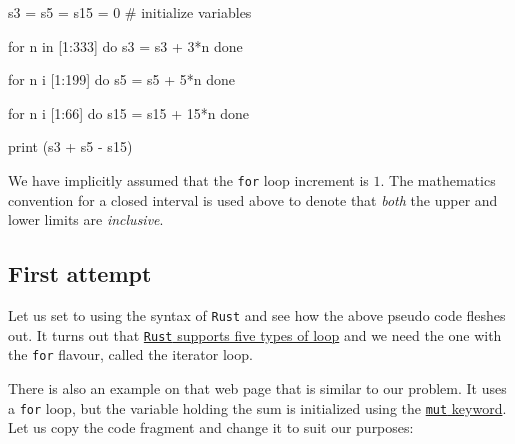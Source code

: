 \documentclass[
  a4paper,
]{article}
\newenvironment{Shaded}{\begin{snugshade}}{\end{snugshade}}
\newcommand{\NormalTok}[1]{\textcolor[rgb]{0.80,0.80,0.80}{#1}}
\begin{document}
\begin{Shaded}
\begin{Highlighting}[]
\NormalTok{s3 = s5 = s15 = 0 \# initialize variables}

\NormalTok{for n in [1:333]}
\NormalTok{do}
\NormalTok{  s3 = s3 + 3*n}
\NormalTok{done}

\NormalTok{for n i [1:199]}
\NormalTok{do}
\NormalTok{  s5 = s5 + 5*n}
\NormalTok{done}

\NormalTok{for n i [1:66]}
\NormalTok{do}
\NormalTok{  s15 = s15 + 15*n}
\NormalTok{done}

\NormalTok{print (s3 + s5 {-} s15)}
\end{Highlighting}
\end{Shaded}

We have implicitly assumed that the \texttt{for} loop increment is
\(1\). The mathematics convention for a closed interval is used above to
denote that \emph{both} the upper and lower limits are \emph{inclusive}.

\hypertarget{first-attempt}{%
\subsection{First attempt}\label{first-attempt}}

Let us set to using the syntax of \texttt{Rust} and see how the above
pseudo code fleshes out. It turns out that
\href{https://doc.rust-lang.org/reference/expressions/loop-expr.html}{\texttt{Rust}
supports five types of loop} and we need the one with the \texttt{for}
flavour, called the iterator loop.

There is also an example on that web page that is similar to our
problem. It uses a \texttt{for} loop, but the variable holding the sum
is initialized using the
\href{https://doc.rust-lang.org/std/keyword.mut.html}{\texttt{mut}
keyword}. Let us copy the code fragment and change it to suit our
purposes:
\end{document}
